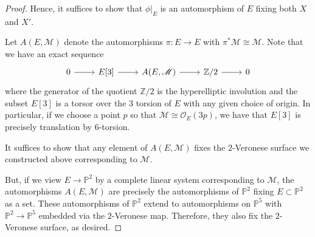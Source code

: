 \documentclass[reqno, 11pt]{amsart}
\theoremstyle{definition}
\theoremstyle{remark}
\numberwithin{equation}{section}
\numberwithin{thm}{section}
\numberwithin{prop}{section}
\numberwithin{lem}{section}
\numberwithin{cor}{section}
\numberwithin{conj}{section}
\numberwithin{defn}{section}
\theoremstyle{plain}
\theoremstyle{definition}
\newcommand\bp{{\mathbb P}}
\newcommand\bz{{\mathbb Z}}
\newcommand\scm{\mathscr M}
\newcommand\sco{\mathscr O}
\newcommand \ra{\rightarrow}
\begin{document}
\begin{proof}
  Hence, it suffices to show that $\phi|_E$ is an automorphism of $E$ fixing both 
  $X$ and $X'$.    

  Let $A(E, \scm)$ denote the automorphisms $\pi:E \ra E$ with $\pi^* \scm \cong \scm$.
  Note that we have an exact sequence
\begin{equation}
  \nonumber
  \label{equation:}
  \begin{tikzcd} 
    0 \ar{r} & E[3] \ar {r} & A(E, \scm) \ar{r} & \bz/2 \ar{r} & 0 
  \end{tikzcd}\end{equation}
  where the generator of the quotient $\bz/2$ is the hyperelliptic involution and the
  subset $E[3]$ is a torsor over the $3$ torsion of $E$ with any given
  choice of origin.
  In particular, if we choose a point $p$ so that $\scm \cong \sco_E(3p)$,
  we have that $E[3]$ is precisely translation by $6$-torsion.

  It suffices to show that any element of $A(E, \scm)$
  fixes the $2$-Veronese surface we constructed above corresponding
  to $\scm$.

  But, if we view $E \ra \bp^2$ by a complete linear system corresponding
  to $\scm$, the automorphisms
  $A(E, \scm)$ are precisely the automorphisms of $\bp^2$
  fixing $E \subset \bp^2$ as a set.
  These automorphisms of $\bp^2$ extend to automorphisms on $\bp^5$
  with $\bp^2 \ra \bp^5$ embedded via the $2$-Veronese map.
  Therefore, they also fix the $2$-Veronese surface, as desired.
\end{proof}
\end{document}

